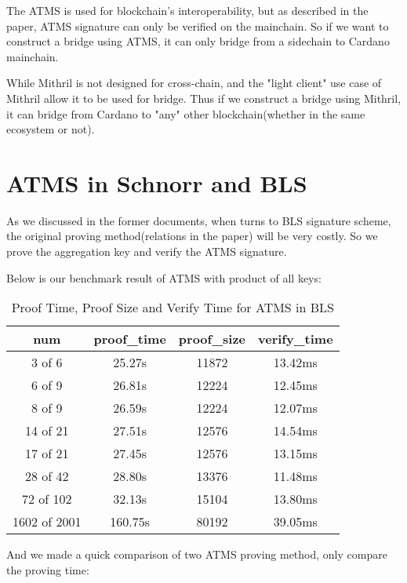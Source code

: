 \documentclass{article}
\begin{document}
The ATMS is used for blockchain's interoperability, but as described in the paper, ATMS signature can only be verified on the mainchain. So if we want to construct a bridge using ATMS, it can only bridge from a sidechain to Cardano mainchain.

While Mithril is not designed for cross-chain, and the "light client" use case of Mithril allow it to be used for bridge. Thus if we construct a bridge using Mithril, it can bridge from Cardano to "any" other blockchain(whether in the same ecosystem or not).

\newpage

\section{ATMS in Schnorr and BLS}

As we discussed in the former documents, when turns to BLS signature scheme, the original proving method(relations in the paper) will be very costly. So we prove the aggregation key and verify the ATMS signature.

Below is our benchmark result of ATMS with product of all keys:


\begin{table}[htbp]
\centering
\begin{tabular}{c|c|c|c}
\hline
\textbf{num} & \textbf{proof\_time} & \textbf{proof\_size} & \textbf{verify\_time} \\ \hline
3 of 6 & 25.27s & 11872 & 13.42ms \\
6 of 9 & 26.81s & 12224 & 12.45ms \\
8 of 9 & 26.59s & 12224 & 12.07ms \\
14 of 21 & 27.51s & 12576 & 14.54ms \\
17 of 21 & 27.45s & 12576 & 13.15ms \\
28 of 42 & 28.80s & 13376 & 11.48ms \\
72 of 102 & 32.13s & 15104 & 13.80ms \\
1602 of 2001 & 160.75s & 80192 & 39.05ms \\ \hline
\end{tabular}
\caption{Proof Time, Proof Size and Verify Time for ATMS in BLS}
\end{table}


And we made a quick comparison of two ATMS proving method, only compare the proving time:
\end{document}
